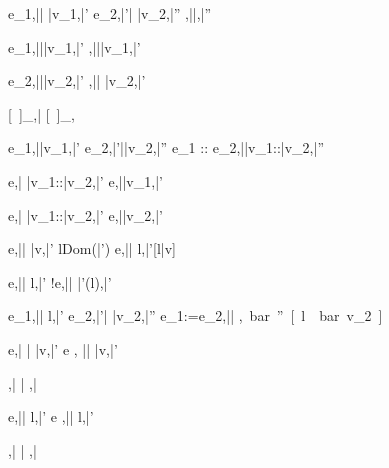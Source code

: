   {e_1,\bar{\sigma}\bar{\eval} \bar{v_1},\bar{\sigma'} \Quad
   e_2,\bar{\sigma'}\bar{\eval} \bar{v_2},\bar{\sigma''}}
  {,\bar{\sigma}\bar{\eval},\bar{\sigma''}}

  {e_1,\bar{\sigma}\bar{\eval}\bar{v_1},\bar{\sigma'}}
  {\Fst{},\bar{\sigma}\bar{\eval}\bar{v_1},\bar{\sigma'}}

  {e_2,\bar{\sigma}\bar{\eval}\bar{v_2},\bar{\sigma'}}
  {\Snd{},\bar{\sigma}\bar{\eval} \bar{v_2},\bar{\sigma'} }


  { }
  {[\ ]_\beta,\sigma \bar{\eval} [\ ]_\beta,\sigma}

  {e_1,\sigma\bar{\eval}\bar{v_1},\bar{\sigma'}\Quad
   e_2,\bar{\sigma'}\bar{\eval}\bar{v_2},\bar{\sigma''}}
  {e_1 :: e_2,\sigma\bar{\eval}\bar{v_1}::\bar{v_2},\bar{\sigma''}}

  {e,\sigma\bar{\eval} \bar{v_1}::\bar{v_2},\bar{\sigma'}}
  { e,\sigma\bar{\eval}\bar{v_1},\bar{\sigma'}}

{e,\sigma\bar{\eval} \bar{v_1}::\bar{v_2},\bar{\sigma'}}
{ e,\sigma\bar{\eval}\bar{v_2},\bar{\sigma'}}



  {e,\bar{\sigma}\bar{\eval} \bar{v},\bar{\sigma'} \Quad
   l\not\in Dom(\bar{\sigma'})}
  {\Ref e,\bar{\sigma}\bar{\eval} l,\bar{\sigma'}[l\mapsto \bar{v}]}

  {e,\bar{\sigma}\bar{\eval} l,\bar{\sigma'}}
  {!e,\bar{\sigma}\bar{\eval} \bar{\sigma'}(l),\bar{\sigma'}}

  {e_1,\bar{\sigma}\bar{\eval} l,\bar{\sigma'} \Quad
   e_2,\bar{\sigma'}\bar{\eval} \bar{v_2},\bar{\sigma''}}
  {e_1:=e_2,\bar{\sigma}\bar{\eval} \unit,\bar{\sigma''}[l\mapsto \bar{v_2}]}

  {e,\bar{\sigma} \bar{\eval} \bar{v},\bar{\sigma'}}
  {\Edit e , \bar{\sigma}\bar{\eval} \Edit \bar{v},\bar{\sigma'}}

  {}
  {\Enter \tau,\bar{\sigma} \bar{\eval} \Enter \tau,\bar{\sigma}}

  {e,\bar{\sigma}\bar{\eval} l,\bar{\sigma'}}
  {\Update e ,\bar{\sigma}\bar{\eval} \Update l,\bar{\sigma'}}


  {}
  {\Fail,\bar{\sigma} \bar{\eval} \Fail,\bar{\sigma}}


